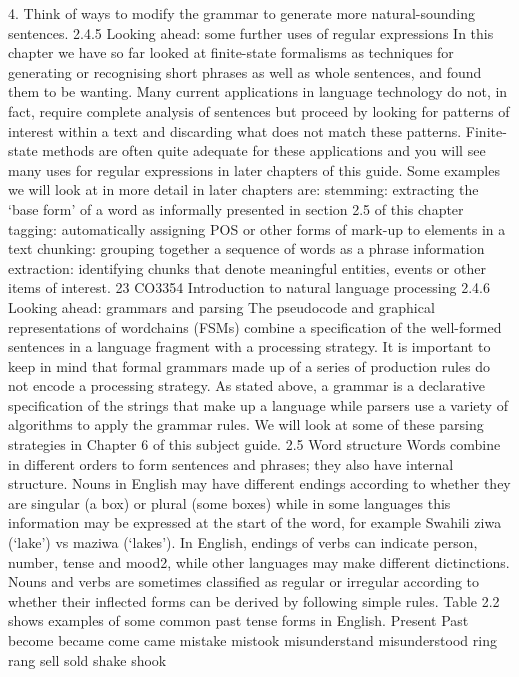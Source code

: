 4. Think of ways to modify the grammar to generate more natural-sounding sentences.
2.4.5 Looking ahead: some further uses of regular expressions
In this chapter we have so far looked at finite-state formalisms as techniques for
generating or recognising short phrases as well as whole sentences, and found them
to be wanting. Many current applications in language technology do not, in fact,
require complete analysis of sentences but proceed by looking for patterns of interest
within a text and discarding what does not match these patterns. Finite-state
methods are often quite adequate for these applications and you will see many uses
for regular expressions in later chapters of this guide. Some examples we will look at
in more detail in later chapters are:
stemming: extracting the ‘base form’ of a word as informally presented in
section 2.5 of this chapter
tagging: automatically assigning POS or other forms of mark-up to elements in a
text
chunking: grouping together a sequence of words as a phrase
information extraction: identifying chunks that denote meaningful entities,
events or other items of interest.
23
CO3354 Introduction to natural language processing
2.4.6 Looking ahead: grammars and parsing
The pseudocode and graphical representations of wordchains (FSMs) combine a
specification of the well-formed sentences in a language fragment with a processing
strategy. It is important to keep in mind that formal grammars made up of a series of
production rules do not encode a processing strategy. As stated above, a grammar is
a declarative specification of the strings that make up a language while parsers use a
variety of algorithms to apply the grammar rules. We will look at some of these
parsing strategies in Chapter 6 of this subject guide.
2.5 Word structure
Words combine in different orders to form sentences and phrases; they also have
internal structure. Nouns in English may have different endings according to
whether they are singular (a box) or plural (some boxes) while in some languages
this information may be expressed at the start of the word, for example Swahili ziwa
(‘lake’) vs maziwa (‘lakes’). In English, endings of verbs can indicate person, number,
tense and mood2, while other languages may make different dictinctions. Nouns and
verbs are sometimes classified as regular or irregular according to whether their
inflected forms can be derived by following simple rules. Table 2.2 shows examples
of some common past tense forms in English.
Present Past
become became
come came
mistake mistook
misunderstand misunderstood
ring rang
sell sold
shake shook
